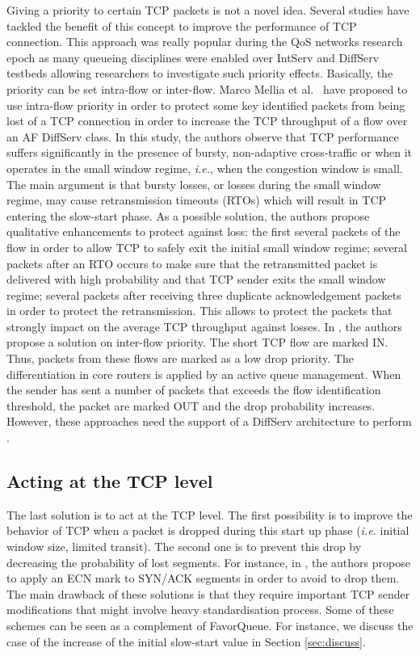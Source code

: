\documentclass{elsart}
\begin{document}
Giving a priority to certain TCP packets is not a novel idea. Several studies have tackled the benefit of this concept to improve the performance of TCP connection. This approach was really popular during the QoS networks research epoch as many queueing disciplines were enabled over IntServ and DiffServ testbeds allowing researchers to investigate such priority effects. Basically, the priority can be set intra-flow or inter-flow. 
Marco Mellia et al.~\cite{mellia02} have proposed to use intra-flow priority in order to protect some key identified packets from being lost of a TCP connection in order to increase the TCP throughput of a flow over an AF DiffServ class. In this study, the authors observe that TCP performance suffers significantly in the presence of bursty,  non-adaptive cross-traffic or when it operates in the small window regime, \textit{i.e.}, when the congestion window is small. The main argument is that bursty losses,  or losses during the small window regime, may cause retransmission timeouts (RTOs) which will result in TCP entering the slow-start phase. As a possible solution, the authors propose qualitative enhancements to protect against loss: the first several packets of the flow in order to allow TCP to safely exit the initial small window regime; several packets after an RTO occurs to make sure that the retransmitted packet is delivered with high probability and that TCP sender exits the small window regime; several packets after receiving three duplicate acknowledgement packets in order to protect the retransmission. This allows to protect the packets that strongly impact on the average TCP throughput against losses.
In \cite{chen03}\cite{Guo01}, the authors propose a solution on inter-flow priority. The short TCP flow are marked IN. Thus, packets from these flows are marked as a low drop priority. The differentiation in core routers is applied by an active queue management. When the sender has sent a number of packets that exceeds the flow identification threshold, the packet are marked OUT and the drop probability increases. However, these approaches need the support of a DiffServ architecture to perform \cite{rfc2475}.

\subsection{Acting at the TCP level}

The last solution is to act at the TCP level. The first possibility is to improve the behavior of TCP when a packet is dropped during this start up phase (\textit{i.e.} initial window size, limited transit). The second one is to prevent this drop by decreasing the probability of lost segments. For instance, in \cite{rfc5562}, the authors propose to apply an ECN mark to SYN/ACK segments in order to avoid to drop them. The main drawback of these solutions is that they require important TCP sender modifications that might involve heavy standardisation process. Some of these schemes can be seen as a complement of FavorQueue. For instance, we discuss the case of the increase of the initial slow-start value in Section \ref{sec:discuss}.
\end{document}
